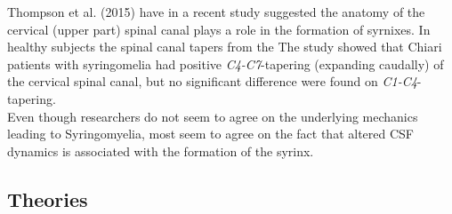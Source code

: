 Thompson et al. (2015) \cite{Thom15} have in a recent study suggested the anatomy of the cervical (upper part) spinal canal plays a role in the formation of syrnixes. In healthy subjects the spinal canal tapers from the The study showed that Chiari patients with syringomelia had positive \textit{C4-C7}-tapering (expanding caudally) of the cervical spinal canal, but no significant difference were found on \textit{C1-C4}-tapering. 
\\
Even though researchers do not seem to agree on the underlying mechanics leading to Syringomyelia, most seem to agree on the fact that altered CSF dynamics is associated with the formation of the syrinx. 
\subsection{Theories}

\cite{Will80}

